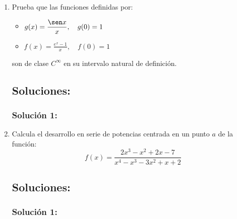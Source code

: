 \documentclass[a4paper, 11pt]{article} %
\begin{document}
\begin{enumerate}
	\item Prueba que las funciones definidas por:
	\begin{itemize}
		\item $\displaystyle{g(x) = \frac{\sen x}{x}, \quad g(0) = 1}$
		\item $\displaystyle{f(x) = \frac{e^x-1}{x}, \quad f(0) = 1}$
	\end{itemize}
	son de clase $\mathit{C}^\infty$ en su intervalo natural de definición.
	\subsection*{Soluciones:}
		\subsubsection*{Solución 1:}
	
	\item Calcula el desarrollo en serie de potencias centrada en un punto $a$ de la función:
	$$\displaystyle{f(x) = \frac{2x^3-x^2+2x-7}{x^4-x^3-3x^2+x+2}}$$
	\subsection*{Soluciones:}
		\subsubsection*{Solución 1:}
	
\end{enumerate}
\end{document}
